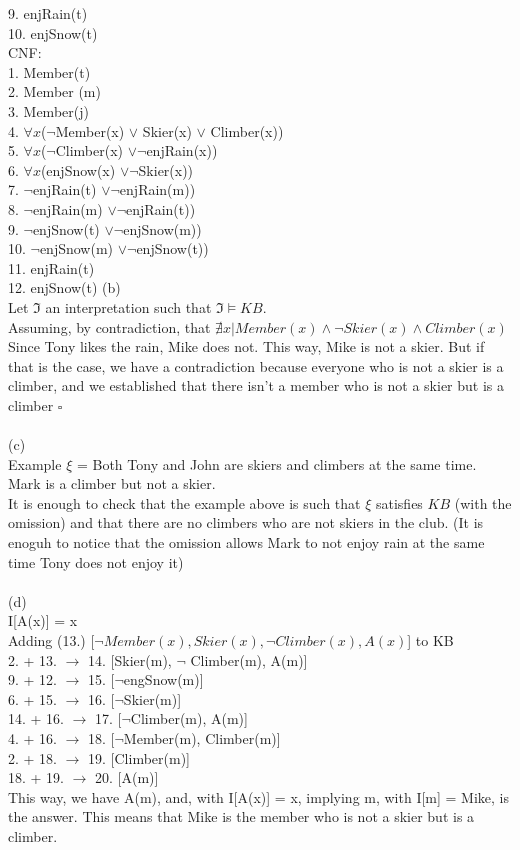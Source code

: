 \documentclass[]{article}
\begin{document}
	9. enjRain(t) \\
	10. enjSnow(t) \\ 
	CNF: \\
	1. Member(t) \\
	2. Member (m) \\
	3. Member(j) \\
	4. $\forall{x}$($\neg$Member(x) $\lor$ Skier(x) $\lor$ Climber(x)) \\
	5. $\forall{x}$($\neg$Climber(x) $\lor \neg$enjRain(x)) \\
	6. $\forall{x}$(enjSnow(x) $\lor \neg$Skier(x)) \\
	7. $\neg$enjRain(t) $\lor \neg$enjRain(m)) \\
	8. $\neg$enjRain(m) $\lor \neg$enjRain(t)) \\
	9. $\neg$enjSnow(t) $\lor \neg$enjSnow(m)) \\
	10. $\neg$enjSnow(m) $\lor \neg$enjSnow(t)) \\
	11. enjRain(t) \\
	12. enjSnow(t)
	\clearpage
	(b)\\
	Let $\Im$ an interpretation such that $\Im \models KB$. \\
	Assuming, by contradiction, that $\nexists x | Member(x) \land \neg Skier(x) \land Climber(x)$ \\
	Since Tony likes the rain, Mike does not. This way, Mike is not a skier. But if that is the case, we have a contradiction because everyone who is not a skier is a climber, and we established that there isn't a member who is not a skier but is a climber $\square$\\  \\
	(c) \\
	Example $\xi$ = Both Tony and John are skiers and climbers at the same time. Mark is a climber but not a skier.\\
	It is enough to check that the example above is such that $\xi$ satisfies $KB$ (with the omission) and that there are no climbers who are not skiers in the club. (It is enoguh to notice that the omission allows Mark to not enjoy rain at the same time Tony does not enjoy it)\\\\
	(d) \\
	I[A(x)] = x \\ 
	Adding (13.) [$\neg Member(x), Skier(x), \neg Climber(x), A(x)$] to KB\\
	2. + 13. $\longrightarrow$ 14. [Skier(m), $\neg$ Climber(m), A(m)]\\
	9. + 12. $\longrightarrow$ 15. [$\neg$engSnow(m)] \\
	6. + 15. $\longrightarrow$ 16. [$\neg$Skier(m)] \\
	14. + 16.  $\longrightarrow$ 17. [$\neg$Climber(m), A(m)]\\
	4. + 16. $\longrightarrow$ 18. [$\neg$Member(m), Climber(m)] \\
	2. + 18. $\longrightarrow$ 19. [Climber(m)] \\
	18. + 19. $\longrightarrow$ 20. [A(m)]\\
	This way, we have A(m), and, with I[A(x)] = x, implying m, with I[m] = Mike, is the answer. This means that Mike is the member who is not a skier but is a climber.
	\\
\end{document}
